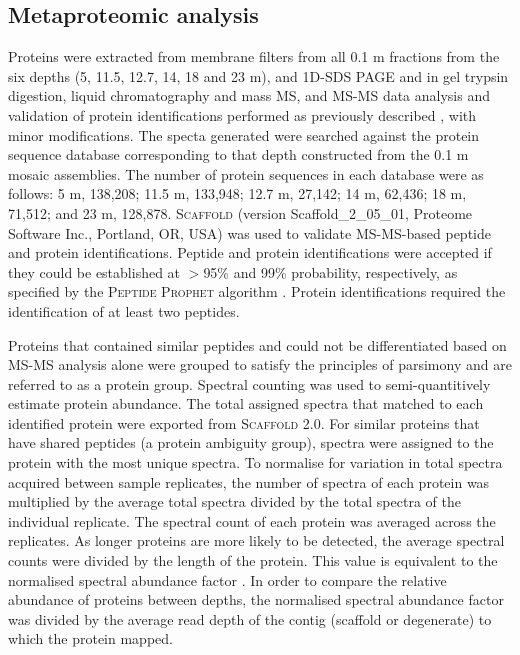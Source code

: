 \subsection{Metaproteomic analysis}
Proteins were extracted from membrane filters from all 0.1 \textmu{}m fractions from the six depths (5, 11.5, 12.7, 14, 18 and 23 m), and \ac{1D-SDS PAGE} and in gel trypsin digestion, liquid chromatography and mass \ac{MS}, and \ac{MS-MS} data analysis and validation of protein identifications performed as previously described \cite{Ng2010a}, with minor modifications.
The specta generated were searched against the protein sequence database corresponding to that depth constructed from the 0.1 \textmu{}m mosaic assemblies. 
The number of protein sequences in each database were as follows: 5 m, 138,208; 11.5 m, 133,948; 12.7 m, 27,142; 14 m, 62,436; 18 m, 71,512; and 23 m, 128,878. 
\textsc{Scaffold} (version Scaffold\_2\_05\_01, Proteome Software Inc., Portland, \textsc{OR}, \textsc{USA}) was used to validate \ac{MS-MS}-based peptide and protein identifications. 
Peptide and protein identifications were accepted if they could be established at $>$95\% and 99\% probability, respectively, as specified by the \textsc{Peptide Prophet} algorithm \cite{Keller2002}. 
Protein identifications required the identification of at least two peptides.
 
Proteins that contained similar peptides and could not be differentiated based on \ac{MS-MS} analysis alone were grouped to satisfy the principles of parsimony and are referred to as a protein group. 
Spectral counting was used to semi-quantitively estimate protein abundance. 
The total assigned spectra that matched to each identified protein were exported from \textsc{Scaffold} 2.0. 
For similar proteins that have shared peptides (a protein ambiguity group), spectra were assigned to the protein with the most unique spectra. 
To normalise for variation in total spectra acquired between sample replicates, the number of spectra of each protein was multiplied by the average total spectra divided by the total spectra of the individual replicate. 
The spectral count of each protein was averaged across the replicates. 
As longer proteins are more likely to be detected, the average spectral counts were divided by the length of the protein. 
This value is equivalent to the normalised spectral abundance factor \cite{Florens2006, Zybailov2006}. 
In order to compare the relative abundance of proteins between depths, the normalised spectral abundance factor was divided by the average read depth of the contig (scaffold or degenerate) to which the protein mapped. 

